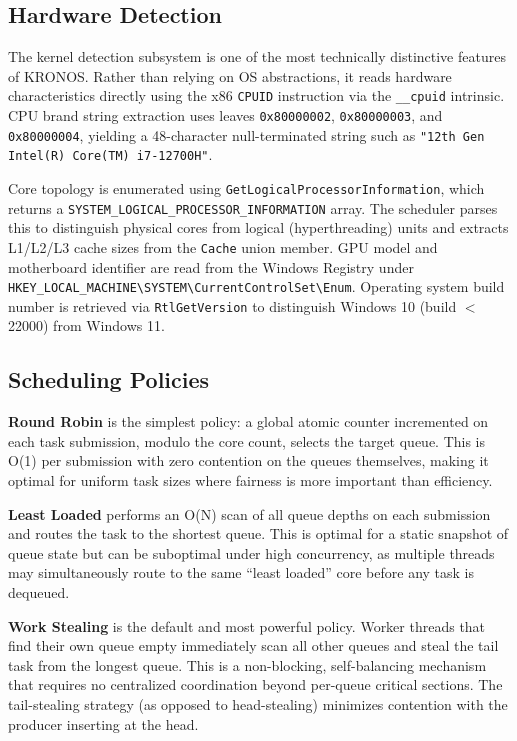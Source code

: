 \documentclass[12pt,a4paper]{article}
\begin{document}
\subsection{Hardware Detection}

The kernel detection subsystem is one of the most technically distinctive features of KRONOS. Rather than relying on OS abstractions, it reads hardware characteristics directly using the x86 \texttt{CPUID} instruction via the \texttt{\_\_cpuid} intrinsic. CPU brand string extraction uses leaves \texttt{0x80000002}, \texttt{0x80000003}, and \texttt{0x80000004}, yielding a 48-character null-terminated string such as \texttt{"12th Gen Intel(R) Core(TM) i7-12700H"}.

Core topology is enumerated using \texttt{GetLogicalProcessorInformation}, which returns a \texttt{SYSTEM\_LOGICAL\_PROCESSOR\_INFORMATION} array. The scheduler parses this to distinguish physical cores from logical (hyperthreading) units and extracts L1/L2/L3 cache sizes from the \texttt{Cache} union member. GPU model and motherboard identifier are read from the Windows Registry under \texttt{HKEY\_LOCAL\_MACHINE\textbackslash{}SYSTEM\textbackslash{}CurrentControlSet\textbackslash{}Enum}. Operating system build number is retrieved via \texttt{RtlGetVersion} to distinguish Windows 10 (build $<$ 22000) from Windows 11.

\subsection{Scheduling Policies}

\textbf{Round Robin} is the simplest policy: a global atomic counter incremented on each task submission, modulo the core count, selects the target queue. This is O(1) per submission with zero contention on the queues themselves, making it optimal for uniform task sizes where fairness is more important than efficiency.

\textbf{Least Loaded} performs an O(N) scan of all queue depths on each submission and routes the task to the shortest queue. This is optimal for a static snapshot of queue state but can be suboptimal under high concurrency, as multiple threads may simultaneously route to the same ``least loaded'' core before any task is dequeued.

\textbf{Work Stealing} is the default and most powerful policy. Worker threads that find their own queue empty immediately scan all other queues and steal the tail task from the longest queue. This is a non-blocking, self-balancing mechanism that requires no centralized coordination beyond per-queue critical sections. The tail-stealing strategy (as opposed to head-stealing) minimizes contention with the producer inserting at the head.
\end{document}
